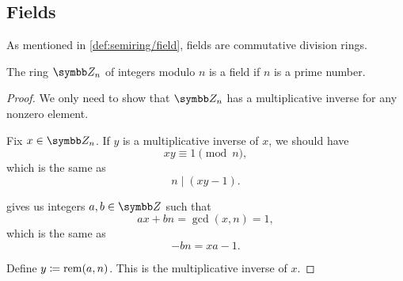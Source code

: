 \subsection{Fields}\label{subsec:fields}

\begin{definition}\label{def:field}
  As mentioned in \cref{def:semiring/field}, fields are commutative division rings.
\end{definition}

\begin{theorem}\label{thm:ring_of_integers_module_prime_is_field}
  The ring \( \Z_n \) of integers modulo \( n \) is a field if \( n \) is a prime number.
\end{theorem}
\begin{proof}
  We only need to show that \( \Z_n \) has a multiplicative inverse for any nonzero element.

  Fix \( x \in \Z_n \). If \( y \) is a multiplicative inverse of \( x \), we should have
  \begin{equation*}
    xy \equiv 1 \pmod n,
  \end{equation*}
  which is the same as
  \begin{equation*}
    n \mid (xy - 1).
  \end{equation*}

   gives us integers \( a, b \in \Z \) such that
  \begin{equation*}
    ax + bn = \gcd(x, n) = 1,
  \end{equation*}
  which is the same as
  \begin{equation*}
    -bn = xa - 1.
  \end{equation*}

  Define \( y \coloneqq \operatorname{rem}(a, n) \). This is the multiplicative inverse of \( x \).
\end{proof}

